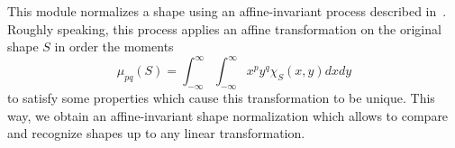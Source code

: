 This module normalizes a shape using an affine-invariant process described
in~\cite{cohignac:reconnaissance}. 
Roughly speaking, this process applies an affine transformation on the
original shape $S$ in order the moments 
$$\mu_{pq}(S)=\int_{-\infty}^{\infty}\int_{-\infty}^{\infty}x^py^q \chi_S(x,y)dxdy$$
to satisfy some properties which cause this transformation to be unique. 
This way, we obtain an affine-invariant 
shape normalization which allows to compare and recognize shapes up to 
any linear transformation.
